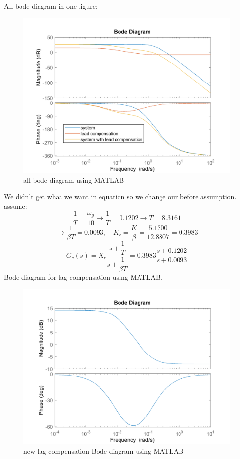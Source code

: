 All bode diagram in one figure:
\begin{figure}[H]
	\caption{all bode diagram using MATLAB}
	\centering
	\includegraphics[width=12cm]{../Figure/Q1/b/all_in_one.png}
\end{figure}
We didn't get what we want in equation so we change our before assumption.
assume:
$$
\dfrac{1}{T} = \dfrac{\omega_g}{10} 
\to \dfrac{1}{T}  = 0.1202 \to T = 8.3161
$$
$$
\to \dfrac{1}{\beta T} = 0.0093, \quad K_c = \dfrac{K}{\beta} = \dfrac{5.1300}{12.8807} = 0.3983
$$
$$
G_c(s) = K_c \dfrac{s + \dfrac{1}{T}}{s + \dfrac{1}{\beta T}}
= 0.3983 \dfrac{s + 0.1202}{s + 0.0093}
$$
Bode diagram for lag compensation using MATLAB.
\begin{figure}[H]
	\caption{new lag compensation Bode diagram using MATLAB}
	\centering
	\includegraphics[width=12cm]{../Figure/Q1/b/new_controller.png}
\end{figure}
